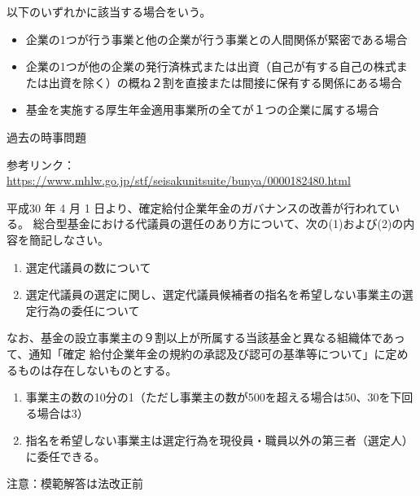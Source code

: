 \begin{answerbox}
  以下のいずれかに該当する場合をいう。
  \begin{itemize}
    \item 企業の1つが行う事業と他の企業が行う事業との人間関係が緊密である場合
    \item 企業の1つが他の企業の発行済株式または出資（自己が有する自己の株式または出資を除く）の概ね２割を直接または間接に保有する関係にある場合
    \item 基金を実施する厚生年金適用事業所の全てが１つの企業に属する場合
  \end{itemize}
\end{answerbox}

\begin{explanationbox}
  過去の時事問題

  参考リンク：\url{https://www.mhlw.go.jp/stf/seisakunitsuite/bunya/0000182480.html}
\end{explanationbox}


\begin{shortanswer}[年金1 \ 2018 \ 問題2(4)]
平成30 年 4 月 1 日より、確定給付企業年金のガバナンスの改善が行われている。
総合型基金における代議員の選任のあり方について、次の(1)および(2)の内容を簡記しなさい。
\begin{enumerate}[(1)]
  \item 選定代議員の数について
  \item 選定代議員の選定に関し、選定代議員候補者の指名を希望しない事業主の選定行為の委任について
\end{enumerate}

なお、基金の設立事業主の９割以上が所属する当該基金と異なる組織体であって、通知「確定
給付企業年金の規約の承認及び認可の基準等について」に定めるものは存在しないものとする。
\end{shortanswer}

\begin{answerbox}
  \begin{enumerate}[(1)]
    \item 事業主の数の10分の1（ただし事業主の数が500を超える場合は50、30を下回る場合は3）
    \item 指名を希望しない事業主は選定行為を現役員・職員以外の第三者（選定人）に委任できる。
  \end{enumerate}
\end{answerbox}

\begin{explanationbox}
  注意：模範解答は法改正前
\end{explanationbox}

